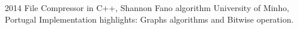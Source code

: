 \documentclass[]{friggeri-cv} %
\begin{document}
\begin{entrylist}
\entry
{2014}
{File Compressor in C++, Shannon Fano algorithm}
{University of Minho, Portugal}
{Implementation highlights: Graphs algorithms and Bitwise operation.
}
\end{entrylist}
\end{document}
